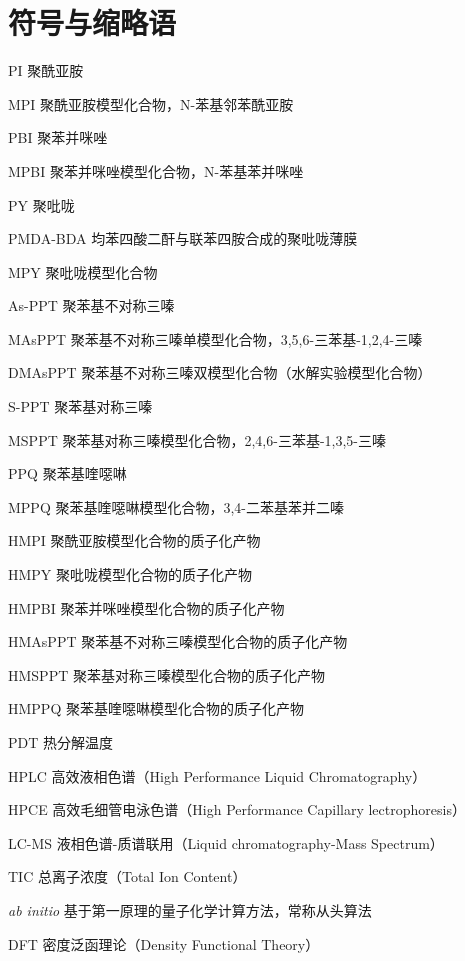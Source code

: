 \documentclass[report,oneside,UTF8,zihao=-4]{config}
\begin{document}
\chapter{符号与缩略语}

\begin{denotation}
  \item[PI] 聚酰亚胺
  \item[MPI] 聚酰亚胺模型化合物，N-苯基邻苯酰亚胺
  \item[PBI] 聚苯并咪唑
  \item[MPBI] 聚苯并咪唑模型化合物，N-苯基苯并咪唑
  \item[PY] 聚吡咙
  \item[PMDA-BDA] 均苯四酸二酐与联苯四胺合成的聚吡咙薄膜
  \item[MPY] 聚吡咙模型化合物
  \item[As-PPT] 聚苯基不对称三嗪
  \item[MAsPPT] 聚苯基不对称三嗪单模型化合物，3,5,6-三苯基-1,2,4-三嗪
  \item[DMAsPPT] 聚苯基不对称三嗪双模型化合物（水解实验模型化合物）
  \item[S-PPT] 聚苯基对称三嗪
  \item[MSPPT] 聚苯基对称三嗪模型化合物，2,4,6-三苯基-1,3,5-三嗪
  \item[PPQ] 聚苯基喹噁啉
  \item[MPPQ] 聚苯基喹噁啉模型化合物，3,4-二苯基苯并二嗪
  \item[HMPI] 聚酰亚胺模型化合物的质子化产物
  \item[HMPY] 聚吡咙模型化合物的质子化产物
  \item[HMPBI] 聚苯并咪唑模型化合物的质子化产物
  \item[HMAsPPT] 聚苯基不对称三嗪模型化合物的质子化产物
  \item[HMSPPT] 聚苯基对称三嗪模型化合物的质子化产物
  \item[HMPPQ] 聚苯基喹噁啉模型化合物的质子化产物
  \item[PDT] 热分解温度
  \item[HPLC] 高效液相色谱（High Performance Liquid Chromatography）
  \item[HPCE] 高效毛细管电泳色谱（High Performance Capillary lectrophoresis）
  \item[LC-MS] 液相色谱-质谱联用（Liquid chromatography-Mass Spectrum）
  \item[TIC] 总离子浓度（Total Ion Content）
  \item[\textit{ab initio}] 基于第一原理的量子化学计算方法，常称从头算法
  \item[DFT] 密度泛函理论（Density Functional Theory）

\end{denotation}
\end{document}

